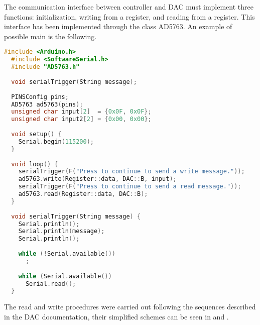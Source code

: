 The communication interface between controller and DAC must implement three functions: initialization, writing from a register, and reading from a register. This interface has been implemented through the class AD5763. An example of possible main is the following.
\begin{lstlisting}[language=c++, gobble=2]
  #include <Arduino.h>
  #include <SoftwareSerial.h>
  #include "AD5763.h"
  
  void serialTrigger(String message);
  
  PINSConfig pins;
  AD5763 ad5763(pins);
  unsigned char input[2]  = {0x0F, 0x0F};
  unsigned char input2[2] = {0x00, 0x00};
  
  void setup() {
    Serial.begin(115200);
  }
  
  void loop() {
    serialTrigger(F("Press to continue to send a write message."));
    ad5763.write(Register::data, DAC::B, input);
    serialTrigger(F("Press to continue to send a read message."));
    ad5763.read(Register::data, DAC::B);
  }
  
  void serialTrigger(String message) {
    Serial.println();
    Serial.println(message);
    Serial.println();
  
    while (!Serial.available())
      ;
  
    while (Serial.available())
      Serial.read();
  }
\end{lstlisting}

The read and write procedures were carried out following the sequences described in the DAC documentation, their simplified schemes can be seen in  and .